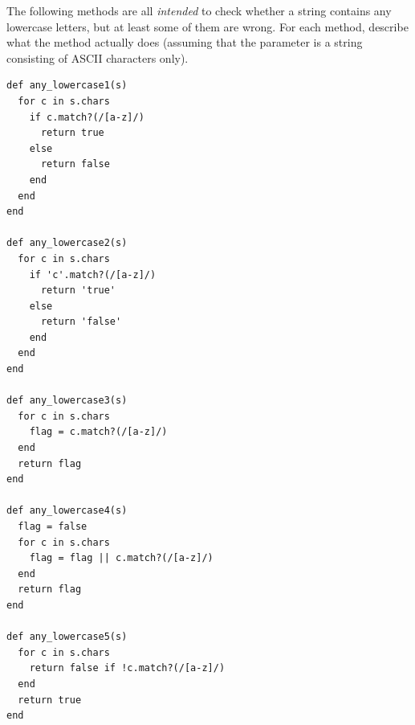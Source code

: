 \documentclass[10pt]{book}
\begin{document}
\begin{exercise}

The following methods are all {\em intended} to check whether a
string contains any lowercase letters, but at least some of them are
wrong.  For each method, describe what the method actually does
(assuming that the parameter is a string consisting of ASCII characters only).

\begin{verbatim}
def any_lowercase1(s)
  for c in s.chars
    if c.match?(/[a-z]/)
      return true
    else
      return false
    end
  end
end

def any_lowercase2(s)
  for c in s.chars
    if 'c'.match?(/[a-z]/)
      return 'true'
    else
      return 'false'
    end
  end
end

def any_lowercase3(s)
  for c in s.chars
    flag = c.match?(/[a-z]/)
  end
  return flag
end

def any_lowercase4(s)
  flag = false
  for c in s.chars
    flag = flag || c.match?(/[a-z]/)
  end
  return flag
end

def any_lowercase5(s)
  for c in s.chars
    return false if !c.match?(/[a-z]/)
  end
  return true
end
\end{verbatim}

\end{exercise}
\end{document}
